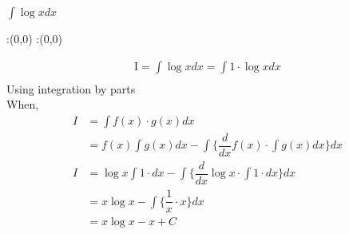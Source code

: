 



\question[5] $\int \log x dx$


\watchout

\ifprintanswers
  \begin{marginfigure}
      :(0,0)
      :(0,0)
    \figdrawbegin{}
      \figdrawline [100,101]
    \figdrawend
    \figvisu{\figBoxA}{}{%
    }
    \centerline{\box\figBoxA}
  \end{marginfigure}
\fi 

\begin{solution}[\halfpage]
\begin{align}
\text{I} = \int \log x dx = \int 1\cdot \log x dx \\
\end{align}
Using integration by parts\\
When,
\begin{align}
I &= \int f(x)\cdot g(x) dx \\
 &= f(x)\int g(x) dx - \int \lbrace \dfrac{d}{dx} f(x) \cdot \int g(x)dx \rbrace dx\\
I &= \log x \int 1\cdot dx - \int \lbrace \dfrac{d}{dx} \log x \cdot \int 1\cdot dx  \rbrace dx\\
&= x \log x - \int \lbrace \dfrac{1}{x} \cdot x \rbrace dx\\
&= x \log x - x + C
\end{align}
\end{solution}

